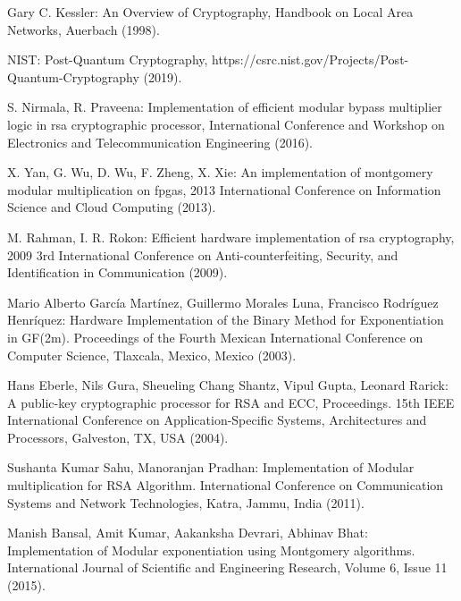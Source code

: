 \documentclass{cpp}
\begin{document}
%
%
\begin{thebibliography}{7}
%


Gary C. Kessler: An Overview of Cryptography, Handbook on Local Area Networks, Auerbach (1998).

NIST: Post-Quantum Cryptography, https://csrc.nist.gov/Projects/Post-Quantum-Cryptography (2019).

S. Nirmala, R. Praveena: Implementation of efficient modular bypass multiplier logic in rsa cryptographic processor, International Conference and Workshop on Electronics and
Telecommunication Engineering (2016).

X. Yan, G. Wu, D. Wu, F. Zheng, X. Xie: An implementation of montgomery modular multiplication on fpgas, 2013 International Conference on Information Science and Cloud Computing (2013).

M. Rahman, I. R. Rokon: Efficient hardware implementation of rsa cryptography, 2009 3rd International Conference on Anti-counterfeiting, Security, and Identification in Communication (2009).  

Mario Alberto García Martínez, Guillermo Morales Luna, Francisco Rodríguez Henríquez: Hardware Implementation of the Binary Method for Exponentiation in GF(2m). Proceedings of the Fourth Mexican International Conference on Computer Science, Tlaxcala, Mexico, Mexico (2003).

Hans Eberle, Nils Gura, Sheueling Chang Shantz, Vipul Gupta, Leonard Rarick: A public-key cryptographic processor for RSA and ECC, Proceedings. 15th IEEE International Conference on Application-Specific Systems, Architectures and Processors, Galveston, TX, USA (2004).

Sushanta Kumar Sahu, Manoranjan Pradhan: Implementation of Modular multiplication for RSA Algorithm. International Conference on Communication Systems and Network Technologies, Katra, Jammu, India (2011).

Manish Bansal, Amit Kumar, Aakanksha Devrari, Abhinav Bhat: Implementation of Modular exponentiation using Montgomery algorithms. International Journal of Scientific and Engineering Research, Volume 6, Issue 11 (2015).


\end{thebibliography}
\end{document}
